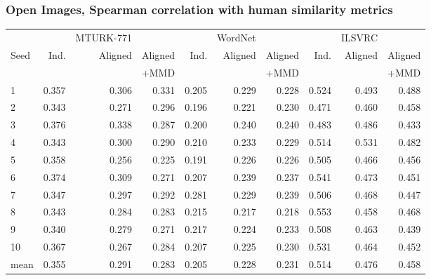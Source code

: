 \subsubsection{Open Images, Spearman correlation with human similarity metrics}
\begin{table}[H]
\begin{tabular}{lrrrrrrrrr}
  \toprule
   &     &   MTURK-771        &               &      &    WordNet       &               &     &  ILSVRC           & \\
{Seed} &  Ind. &   Aligned &  Aligned  & Ind. &   Aligned &  Aligned  & Ind. &   Aligned &  Aligned   \\
{}     &              &           & +MMD      &            &            & +MMD      &             &           &   +MMD \\
\midrule
1    &     0.357 &  0.306 &   0.331 &     0.205 &  0.229 &    0.228 &   0.524 &  0.493 &  0.488  \\
2    &     0.343 &  0.271 &   0.296 &     0.196 &  0.221 &    0.230 &   0.471 &  0.460 &  0.458  \\
3    &     0.376 &  0.338 &   0.287 &     0.200 &  0.240 &    0.240 &   0.483 &  0.486 &  0.433  \\
4    &     0.343 &  0.300 &   0.290 &     0.210 &  0.233 &    0.229 &   0.514 &  0.531 &  0.482 \\
5    &     0.358 &  0.256 &   0.225 &     0.191 &  0.226 &    0.226 &   0.505 &  0.466 &  0.456  \\
6    &     0.374 &  0.309 &   0.271 &     0.207 &  0.239 &    0.237 &   0.541 &  0.473 &  0.451  \\
7    &     0.347 &  0.297 &   0.292 &     0.281 &  0.229 &    0.239 &   0.506 &  0.468 &  0.447  \\
8    &     0.343 &  0.284 &   0.283 &     0.215 &  0.217 &    0.218 &   0.553 &  0.458 &  0.468  \\
9    &     0.340 &  0.279 &   0.271 &     0.217 &  0.224 &    0.233 &   0.508 &  0.463 &  0.439  \\
10   &     0.367 &  0.267 &   0.284 &     0.207 &  0.225 &    0.230 &   0.531 &  0.464 &  0.452  \\
\midrule                                                                                         
mean &     0.355 &  0.291 &   0.283 &     0.205 &  0.228 &    0.231 &   0.514 &  0.476 &  0.458  \\
\bottomrule
\end{tabular}
\end{table}

